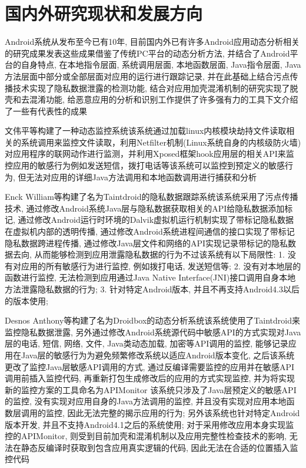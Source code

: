 \section{国内外研究现状和发展方向}
Android系统从发布至今已有10年, 目前国内外已有许多Android应用动态分析相关的研究成果发表\juhao 这些成果借鉴了传统PC平台的动态分析方法, 并结合了Android平台的自身特点, 在本地指令层面, 系统调用层面, 本地函数层面, Java指令层面, Java方法层面中部分或全部层面对应用的运行进行跟踪记录, 并在此基础上结合污点传播技术实现了隐私数据泄露的检测功能, 结合对应用加壳混淆机制的研究实现了脱壳和去混淆功能, 给恶意应用的分析和识别工作提供了许多强有力的工具\juhao 下文介绍了一些有代表性的成果\juhao

文伟平等构建了一种动态监控系统\juhao 该系统通过加载linux内核模块劫持文件读取相关的系统调用来监控文件读取，利用Netfilter机制(Linux系统自身的内核级防火墙)对应用程序的联网动作进行监测，并利用Xposed框架hook应用层的相关API来监控应用的敏感行为例如发送短信，拨打电话等\juhao 该系统可以监控到预定义的敏感行为, 但无法对应用的详细Java方法调用和本地函数调用进行捕获和分析\juhao 

Enck William等构建了名为Taintdroid的隐私数据跟踪系统\juhao 该系统采用了污点传播技术, 通过修改Android系统Java层与隐私数据获取相关的API给隐私数据添加标记, 通过修改Android运行时环境的Dalvik虚拟机运行机制实现了带标记隐私数据在虚拟机内部的透明传播, 通过修改Android系统进程间通信的接口实现了带标记隐私数据跨进程传播, 通过修改Java层文件和网络的API实现记录带标记的隐私数据去向, 从而能够检测到应用泄露隐私数据的行为\juhao 不过该系统有以下局限性: 
1. 没有对应用的所有敏感行为进行监控, 例如拨打电话, 发送短信等;
2. 没有对本地层的函数进行监控, 无法检测到应用通过Java Native Interface(JNI)接口调用自身本地方法泄露隐私数据的行为;
3. 针对特定Android版本, 并且不再支持Android4.3以后的版本使用;
 
Desnos Anthony等构建了名为Droidbox的动态分析系统\juhao 该系统使用了Taintdroid来监控隐私数据泄露, 另外通过修改Android系统源代码中敏感API的方式实现对Java层的电话, 短信, 网络, 文件, Java类动态加载, 加密等API调用的监控, 能够记录应用在Java层的敏感行为\juhao 为避免频繁修改系统以适应Android版本变化, 之后该系统更改了监控Java层敏感API调用的方式, 通过反编译需要监控的应用并在敏感API调用前插入监控代码, 再重新打包生成修改后的应用的方式实现监控, 并为将实现新的监控方案的工具命名为APIMonitor\juhao 
该系统只涉及了Java层预定义的敏感API的监控, 没有实现对应用自身的Java方法调用的监控, 并且没有实现对应用本地函数层调用的监控, 因此无法完整的揭示应用的行为; 另外该系统也针对特定Android版本开发, 并且不支持Android4.1之后的系统使用; 对于采用修改应用本身实现监控的APIMonitor, 则受到目前加壳和混淆机制以及应用完整性检查技术的影响, 无法在静态反编译时获取到包含应用真实逻辑的代码, 因此无法在合适的位置插入监控代码\juhao

